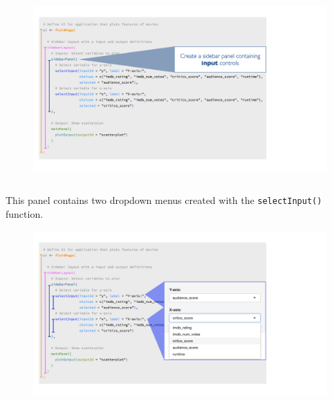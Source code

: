 \documentclass[
  letterpaper,
  DIV=11,
  numbers=noendperiod]{scrreprt}
\begin{document}
\begin{figure}

{\centering \includegraphics[width=1\textwidth,height=\textheight]{./images/input-controls.png}

}

\end{figure}

\hypertarget{section-10}{%
\subsection{}\label{section-10}}

This panel contains two dropdown menus created with the
\texttt{selectInput()} function.

\begin{figure}

{\centering \includegraphics[width=1\textwidth,height=\textheight]{./images/input-dropdowns.png}

}

\end{figure}

\hypertarget{section-11}{%
\subsection{}\label{section-11}}
\end{document}
